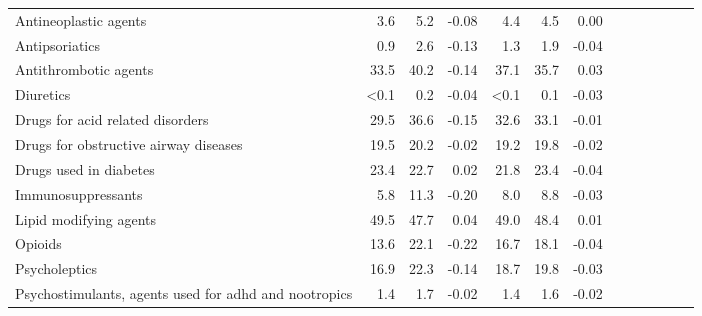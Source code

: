 \documentclass[11pt,]{article}
\begin{document}
\begin{longtable}{lrrrrrrrrrrrr}
      Antineoplastic agents &  3.6 &  5.2 & -0.08 &  4.4 &  4.5 &  0.00 \\ 
      Antipsoriatics &  0.9 &  2.6 & -0.13 &  1.3 &  1.9 & -0.04 \\ 
      Antithrombotic agents & 33.5 & 40.2 & -0.14 & 37.1 & 35.7 &  0.03 \\ 
      Diuretics & <0.1 &  0.2 & -0.04 & <0.1 &  0.1 & -0.03 \\ 
      Drugs for acid related disorders & 29.5 & 36.6 & -0.15 & 32.6 & 33.1 & -0.01 \\ 
      Drugs for obstructive airway diseases & 19.5 & 20.2 & -0.02 & 19.2 & 19.8 & -0.02 \\ 
      Drugs used in diabetes & 23.4 & 22.7 &  0.02 & 21.8 & 23.4 & -0.04 \\ 
      Immunosuppressants &  5.8 & 11.3 & -0.20 &  8.0 &  8.8 & -0.03 \\ 
      Lipid modifying agents & 49.5 & 47.7 &  0.04 & 49.0 & 48.4 &  0.01 \\ 
      Opioids & 13.6 & 22.1 & -0.22 & 16.7 & 18.1 & -0.04 \\ 
      Psycholeptics & 16.9 & 22.3 & -0.14 & 18.7 & 19.8 & -0.03 \\ 
      Psychostimulants, agents used for adhd and nootropics &  1.4 &  1.7 & -0.02 &  1.4 &  1.6 & -0.02 \\ 
   \bottomrule\end{longtable}
\clearpage
{}
\end{document}
